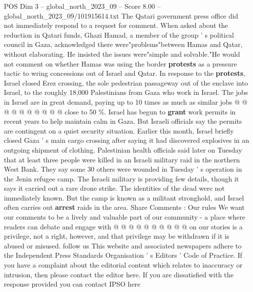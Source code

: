 \begin{textsample}{POS Dim 3 – global\_north\_2023\_09 – Score 8.00 – global\_north\_2023\_09/101915614.txt}
The Qatari government press office did not immediately respond to a request for comment.
When asked about the reduction in Qatari funds, Ghazi Hamad, a member of the group ' s political council in Gaza, acknowledged there were"problems"between Hamas and Qatar, without elaborating.
He insisted the issues were"simple and solvable."He would not comment on whether Hamas was using the border \textbf{protests} as a pressure tactic to wring concessions out of Israel and Qatar.
In response to the \textbf{protests}, Israel closed Erez crossing, the sole pedestrian passageway out of the enclave into Israel, to the roughly 18,000 Palestinians from Gaza who work in Israel.
The jobs in Israel are in great demand, paying up to 10 times as much as similar jobs @ @ @ @ @ @ @ @ @ @ close to 50 \%.
Israel has begun to \textbf{grant} work permits in recent years to help maintain calm in Gaza.
But Israeli officials say the permits are contingent on a quiet security situation.
Earlier this month, Israel briefly closed Gaza ' s main cargo crossing after saying it had discovered explosives in an outgoing shipment of clothing.
Palestinian health officials said later on Tuesday that at least three people were killed in an Israeli military raid in the northern West Bank.
They say some 30 others were wounded in Tuesday ' s operation in the Jenin refugee camp.
The Israeli military is providing few details, though it says it carried out a rare drone strike.
The identities of the dead were not immediately known.
But the camp is known as a militant stronghold, and Israel often carries out \textbf{arrest} raids in the area.
Share Comments : Our rules We want our comments to be a lively and valuable part of our community - a place where readers can debate and engage with @ @ @ @ @ @ @ @ @ @ on our stories is a privilege, not a right, however, and that privilege may be withdrawn if it is abused or misused. follow us This website and associated newspapers adhere to the Independent Press Standards Organisation ' s Editors ' Code of Practice.
If you have a complaint about the editorial content which relates to inaccuracy or intrusion, then please contact the editor here.
If you are dissatisfied with the response provided you can contact IPSO here

\end{textsample}
